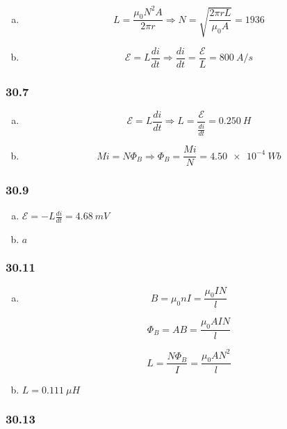 \documentclass{article}
\begin{document}
\begin{enumerate}[(a)]
  \item \[L = \frac{\mu_0 N^2 A}{2 \pi r} \Rightarrow N = \sqrt{\frac{2 \pi r L}{\mu_0 A}} = 1936\]

  \item \[\mathcal{E} = L \frac{di}{dt} \Rightarrow \frac{di}{dt} = \frac{\mathcal{E}}{L} = \qty{800}{A/s}\]
\end{enumerate}

\subsubsection{30.7}

\begin{enumerate}[(a)]
  \item \[\mathcal{E} = L \frac{di}{dt} \Rightarrow L = \frac{\mathcal{E}}{\frac{di}{dt}} = \qty{0.250}{H}\]

  \item \[M i = N \Phi_B \Rightarrow \Phi_B = \frac{M i}{N} = \qty{4.50e-4}{Wb}\]
\end{enumerate}

\subsubsection{30.9}

\begin{enumerate}[(a)]
  \item $\mathcal{E} = -L \frac{di}{dt} = \qty{4.68}{mV}$

  \item $a$
\end{enumerate}

\subsubsection{30.11}

\begin{enumerate}[(a)]
  \item

        \[B = \mu_0 n I = \frac{\mu_0 I N}{l}\]

        \[\Phi_B = A B = \frac{\mu_0 A I N}{l}\]

        \[L = \frac{N \Phi_B}{I} = \frac{\mu_0 A N^2}{l}\]

  \item $L = \qty{0.111}{\mu H}$
\end{enumerate}

\subsubsection{30.13}
\end{document}
